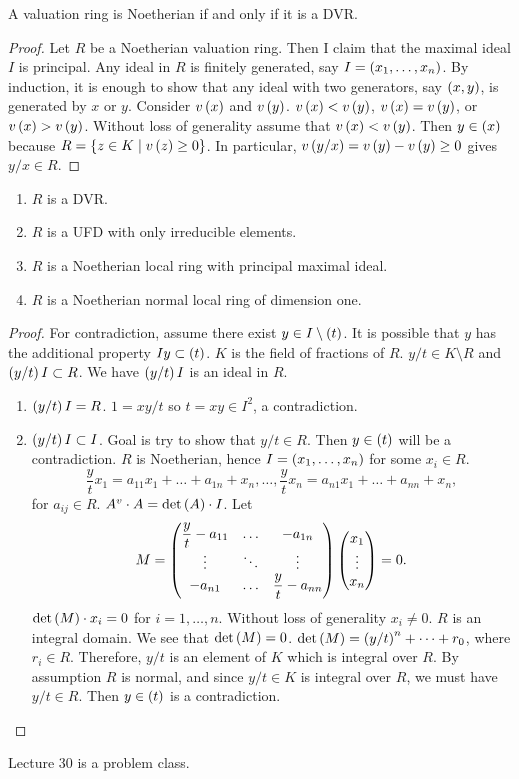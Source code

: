 \begin{theorem}
A valuation ring is Noetherian if and only if it is a DVR.
\end{theorem}

\begin{proof}
Let $ R $ be a Noetherian valuation ring. Then I claim that the maximal ideal $ I $ is principal. Any ideal in $ R $ is finitely generated, say $ I = \left( x_1, \dots, x_n \right) $. By induction, it is enough to show that any ideal with two generators, say $ \left( x, y \right) $, is generated by $ x $ or $ y $. Consider $ v\left( x \right) $ and $ v\left( y \right) $. $ v\left( x \right) < v\left( y \right) $, $ v\left( x \right) = v\left( y \right) $, or $ v\left( x \right) > v\left( y \right) $. Without loss of generality assume that $ v\left( x \right) < v\left( y \right) $. Then $ y \in \left( x \right) $ because $ R = \left\{ z \in K \mid v\left( z \right) \ge 0 \right\} $. In particular, $ v\left( y / x \right) = v\left( y \right) - v\left( y \right) \ge 0 $ gives $ y / x \in R $.
\end{proof}


\begin{theorem}
\hfill
\begin{enumerate}
\item $ R $ is a DVR.
\item $ R $ is a UFD with only irreducible elements.
\item $ R $ is a Noetherian local ring with principal maximal ideal.
\item $ R $ is a Noetherian normal local ring of dimension one.
\end{enumerate}
\end{theorem}

\begin{proof}
For contradiction, assume there exist $ y \in I \setminus \left( t \right) $. It is possible that $ y $ has the additional property $ Iy \subset \left( t \right) $. $ K $ is the field of fractions of $ R $. $ y / t \in K \setminus R $ and $ \left( y / t \right)I \subset R $. We have $ \left( y / t \right)I $ is an ideal in $ R $.
\begin{enumerate}
\item $ \left( y / t \right)I = R $. $ 1 = xy / t $ so $ t = xy \in I^2 $, a contradiction.
\item $ \left( y / t \right)I \subset I $. Goal is try to show that $ y / t \in R $. Then $ y \in \left( t \right) $ will be a contradiction. $ R $ is Noetherian, hence $ I = \left( x_1, \dots, x_n \right) $ for some $ x_i \in R $.
$$ \dfrac{y}{t}x_1 = a_{11}x_1 + \dots + a_{1n} + x_n, \dots, \dfrac{y}{t}x_n = a_{n1}x_1 + \dots + a_{nn} + x_n, $$
for $ a_{ij} \in R $. $ A^v \cdot A = \det\left( A \right) \cdot I $. Let
$$ M = \threebythree{\dfrac{y}{t} - a_{11}}{\dots}{-a_{1n}}{\vdots}{\ddots}{\vdots}{-a_{n1}}{\dots}{\dfrac{y}{t} - a_{nn}}\threebyone{x_1}{\vdots}{x_n} = 0. $$
$ \det\left( M \right) \cdot x_i = 0 $ for $ i = 1, \dots, n $. Without loss of generality $ x_i \ne 0 $. $ R $ is an integral domain. We see that $ \det\left( M \right) = 0 $. $ \det\left( M \right) = \left( y / t \right)^n + \dots + r_0 $, where $ r_i \in R $. Therefore, $ y / t $ is an element of $ K $ which is integral over $ R $. By assumption $ R $ is normal, and since $ y / t \in K $ is integral over $ R $, we must have $ y / t \in R $. Then $ y \in \left( t \right) $ is a contradiction.
\end{enumerate}
\end{proof}


Lecture 30 is a problem class.


